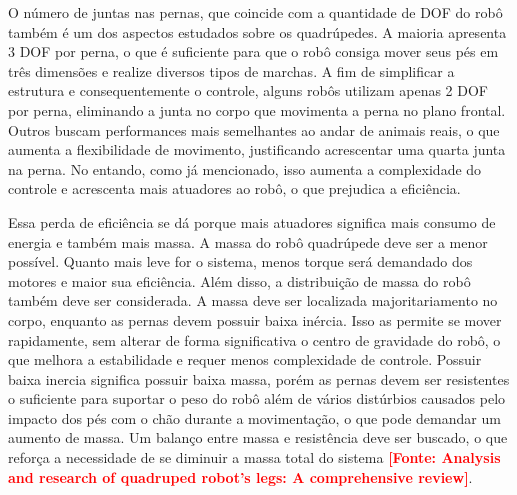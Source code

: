 \documentclass[../main.tex]{subfiles}
\begin{document}
  O número de juntas nas pernas, que coincide com a quantidade de DOF do robô também é um dos aspectos estudados sobre os quadrúpedes. A maioria apresenta 3 DOF por perna, o que é suficiente para que o robô consiga mover seus pés em três dimensões e realize diversos tipos de marchas. A fim de simplificar a estrutura e consequentemente o controle, alguns robôs utilizam apenas 2 DOF por perna, eliminando a junta no corpo que movimenta a perna no plano frontal. Outros buscam performances mais semelhantes ao andar de animais reais, o que aumenta a flexibilidade de movimento, justificando acrescentar uma quarta junta na perna. No entando, como já mencionado, isso aumenta a complexidade do controle e acrescenta mais atuadores ao robô, o que prejudica a eficiência.

  Essa perda de eficiência se dá porque mais atuadores significa mais consumo de energia e também mais massa. A massa do robô quadrúpede deve ser a menor possível. Quanto mais leve for o sistema, menos torque será demandado dos motores e maior sua eficiência. Além disso, a distribuição de massa do robô também deve ser considerada. A massa deve ser localizada majoritariamento no corpo, enquanto as pernas devem possuir baixa inércia. Isso as permite se mover rapidamente, sem alterar de forma significativa o centro de gravidade do robô, o que melhora a estabilidade e requer menos complexidade de controle. Possuir baixa inercia significa possuir baixa massa, porém as pernas devem ser resistentes o suficiente para suportar o peso do robô além de vários distúrbios causados pelo impacto dos pés com o chão durante a movimentação, o que pode demandar um aumento de massa. Um balanço entre massa e resistência deve ser buscado, o que reforça a necessidade de se diminuir a massa total do sistema \textbf{\textcolor{red}{[Fonte: Analysis and research of quadruped robot's legs: A comprehensive review]}}.
\end{document}
